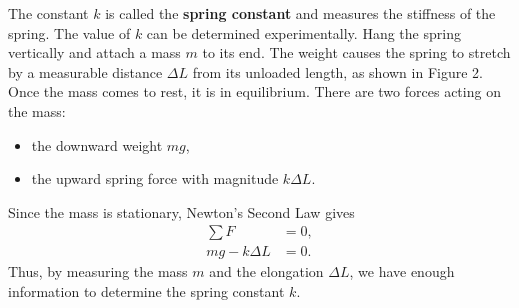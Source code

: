 \documentclass[11pt,letterpaper]{article}
\begin{document}
The constant $k$ is called the \textbf{spring constant} and measures the stiffness of the spring. The value of $k$ can be determined experimentally. Hang the spring vertically and attach a mass $m$ to its end. The weight causes the spring to stretch by a measurable distance $\Delta L$ from its unloaded length, as shown in Figure 2. Once the mass comes to rest, it is in equilibrium. There are two forces acting on the mass:
\begin{itemize}
    \item the downward weight $mg$,
    \item the upward spring force with magnitude $k\Delta L$.
\end{itemize}
Since the mass is stationary, Newton's Second Law gives
\begin{align*}
    \sum F &= 0,\\
    mg-k\Delta L &=0.
\end{align*}
Thus, by measuring the mass $m$ and the elongation $\Delta L$, we have enough information to determine the spring constant $k$.
\end{document}

